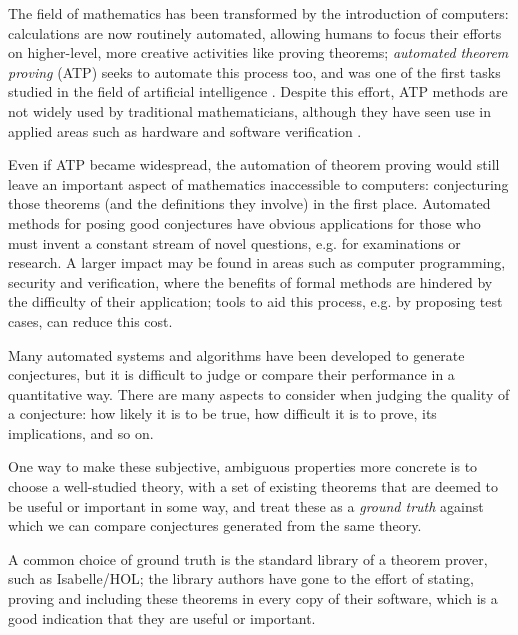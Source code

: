
The field of mathematics has been transformed by the introduction of computers:
calculations are now routinely automated, allowing humans to focus their efforts
on higher-level, more creative activities like proving theorems; \emph{automated
theorem proving} (ATP) seeks to automate this process too, and was one of the
first tasks studied in the field of artificial intelligence
\cite{newell1956logic,sutcliffe2001evaluating}. Despite this effort, ATP
methods are not widely used by traditional mathematicians, although they have
seen use in applied areas such as hardware and software verification
\cite{Moore:2003}.


Even if ATP became widespread, the automation of theorem proving would still
leave an important aspect of mathematics inaccessible to computers: conjecturing
those theorems (and the definitions they involve) in the first place. Automated
methods for posing good conjectures have obvious applications for those who must
invent a constant stream of novel questions, e.g. for examinations or research.
A larger impact may be found in areas such as computer programming, security and
verification, where the benefits of formal methods are hindered by the
difficulty of their application; tools to aid this process, e.g. by proposing
test cases, can reduce this cost.

Many automated systems and algorithms have been developed to generate
conjectures, but it is difficult to judge or compare their performance in a
quantitative way. There are many aspects to consider when judging the quality of
a conjecture: how likely it is to be true, how difficult it is to prove, its
implications, and so on.

One way to make these subjective, ambiguous properties more concrete is to
choose a well-studied theory, with a set of existing theorems that are deemed to
be useful or important in some way, and treat these as a \emph{ground truth}
against which we can compare conjectures generated from the same theory.

A common choice of ground truth is the standard library of a theorem prover,
such as Isabelle/HOL; the library authors have gone to the effort of stating,
proving and including these theorems in every copy of their software, which is a
good indication that they are useful or important.

